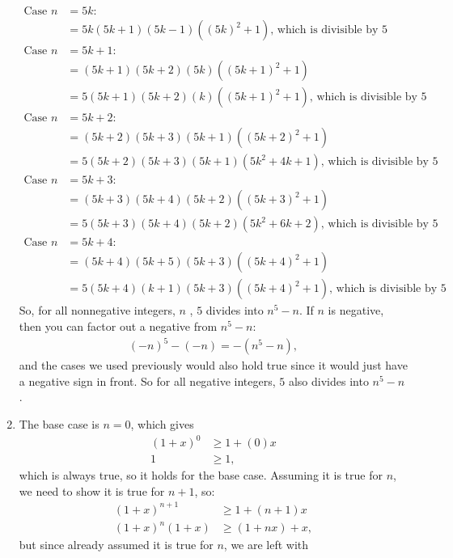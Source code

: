 \documentclass[12pt]{article}
\begin{document}
\begin{enumerate}
    \begin{align*}
        \text{Case } n &= 5k\text{: } \\ &=5k(5k+1)(5k-1)((5k)^2+1) \text{, which is divisible by 5} \\
        \text{Case } n &= 5k+1\text{: } \\ &=(5k+1)(5k+2)(5k)((5k+1)^2+1) \\
        &= 5(5k+1)(5k+2)(k)((5k+1)^2+1)\text{, which is divisible by 5}\\
        \text{Case } n &= 5k+2\text{: } \\ &=(5k+2)(5k+3)(5k+1)((5k+2)^2+1) \\
        &= 5(5k+2)(5k+3)(5k+1)(5k^2+4k+1)\text{, which is divisible by 5}\\
        \text{Case } n &= 5k+3\text{: } \\ &=(5k+3)(5k+4)(5k+2)((5k+3)^2+1) \\
        &= 5(5k+3)(5k+4)(5k+2)(5k^2+6k+2)\text{, which is divisible by 5}\\
        \text{Case } n &= 5k+4\text{: } \\ &=(5k+4)(5k+5)(5k+3)((5k+4)^2+1) \\
        &= 5(5k+4)(k+1)(5k+3)((5k+4)^2+1)\text{, which is divisible by 5}
    \end{align*}
    So, for all nonnegative integers, $n$ , $5$ divides into $n^5-n$. If $n$ is negative, 
    then you can factor out a negative from $n^5-n$:
    \begin{align*}
        (-n)^5-(-n) = -(n^5-n),
    \end{align*}
    and the cases we used previously would also hold true since it would just have 
    a negative sign in front. So for all negative integers, $5$ also divides into $
    n^5 - n$.
    \item The base case is $n = 0$, which gives \begin{align*}
        (1+x)^0 &\geq 1+(0)x \\
        1 &\geq 1,
    \end{align*}
    which is always true, so it holds for the base case. Assuming it is true for $n$,
    we need to show it is true for $n+1$, so:
    \begin{align*}
        (1+x)^{n+1} &\geq 1+(n+1)x\\
        (1+x)^n(1+x) &\geq (1+nx) + x,
    \end{align*}
        but since already assumed it is true for $n$, we are left with 
    \begin{align*}

\end{align*}
\end{enumerate}
\end{document}
